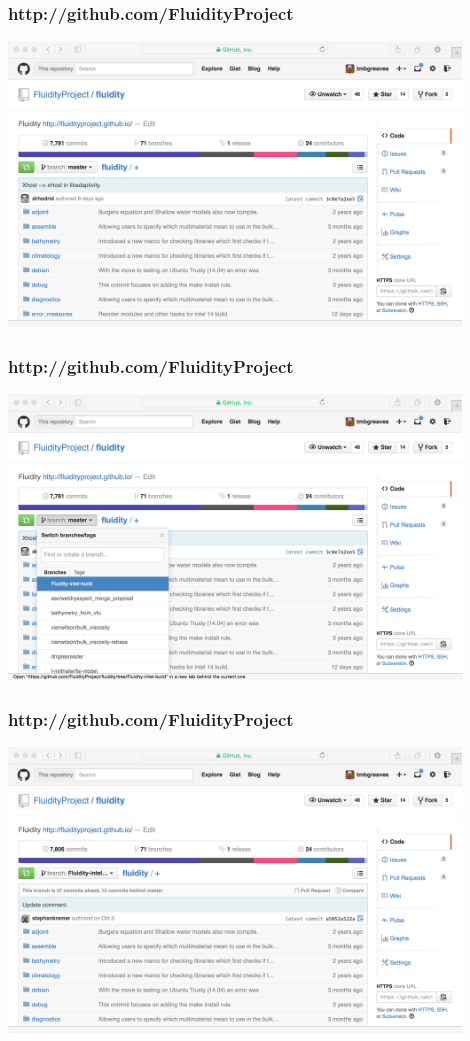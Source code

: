\documentclass[12pt]{beamer}
\begin{document}
\begin{frame}
        \frametitle{http://github.com/FluidityProject}
\begin{center}
    \includegraphics[width=0.9\textwidth]{images/github-master.png}
\end{center}
\end{frame}

\begin{frame}
        \frametitle{http://github.com/FluidityProject}
\begin{center}
    \includegraphics[width=0.9\textwidth]{images/github-changebranch.png}
\end{center}
\end{frame}

\begin{frame}
        \frametitle{http://github.com/FluidityProject}
\begin{center}
    \includegraphics[width=0.9\textwidth]{images/github-changedbranch.png}
\end{center}
\end{frame}
\end{document}
